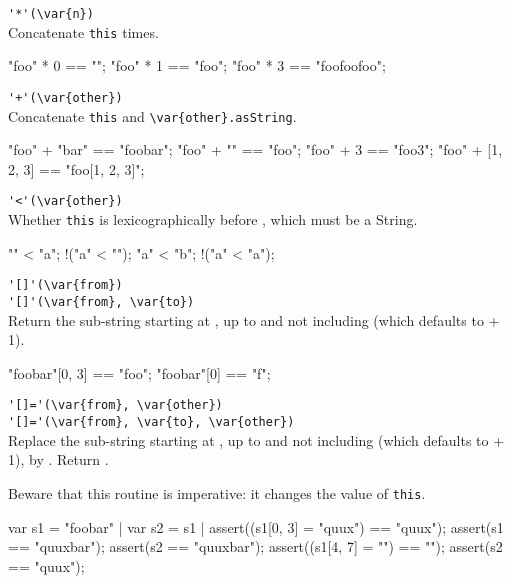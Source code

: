 \begin{urbiscriptapi}
\item \lstinline|'*'(\var{n})|\\
  Concatenate \lstinline|this|  times.
\begin{urbiassert}
"foo" * 0 == "";
"foo" * 1 == "foo";
"foo" * 3 == "foofoofoo";
\end{urbiassert}

\item \lstinline|'+'(\var{other})|\\
  Concatenate \lstinline|this| and \lstinline|\var{other}.asString|.
\begin{urbiassert}
"foo" + "bar" == "foobar";
"foo" + "" == "foo";
"foo" + 3 == "foo3";
"foo" + [1, 2, 3] == "foo[1, 2, 3]";
\end{urbiassert}

\item \lstinline|'<'(\var{other})|\\
  Whether \lstinline|this| is lexicographically before ,
  which must be a String.
\begin{urbiassert}
"" < "a";
!("a" < "");
"a" < "b";
!("a" < "a");
\end{urbiassert}

\item \lstinline|'[]'(\var{from})|\\
  \lstinline|'[]'(\var{from}, \var{to})|\\
  Return the sub-string starting at , up to and not including
   (which defaults to  + 1).
\begin{urbiassert}
"foobar"[0, 3] == "foo";
"foobar"[0] == "f";
\end{urbiassert}

\item \lstinline|'[]='(\var{from}, \var{other})|\\
  \lstinline|'[]='(\var{from}, \var{to}, \var{other})|\\
  Replace the sub-string starting at , up to and not including
   (which defaults to  + 1), by .  Return
  .

  Beware that this routine is imperative: it changes the value of
  \lstinline|this|.
\begin{urbiscript}
var s1 = "foobar" | var s2 = s1 |
assert((s1[0, 3] = "quux") == "quux");
assert(s1 == "quuxbar");
assert(s2 == "quuxbar");
assert((s1[4, 7] = "") == "");
assert(s2 == "quux");
\end{urbiscript}
\end{urbiscriptapi}


